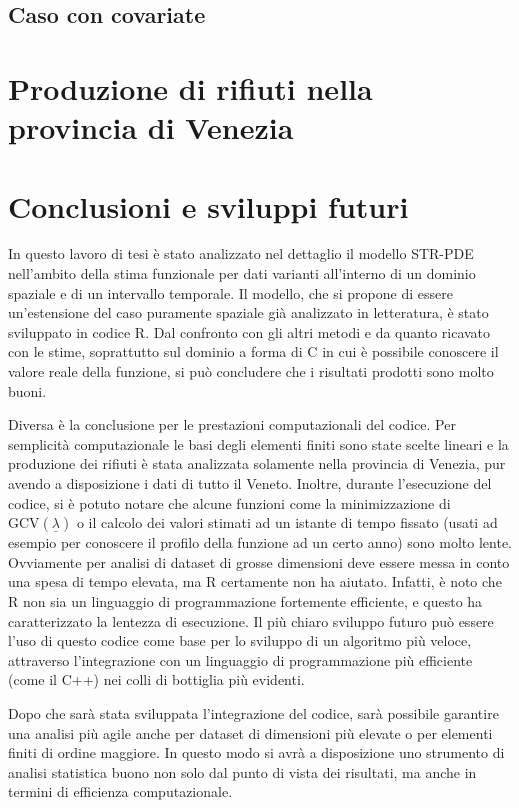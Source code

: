 \documentclass[a4paper,11pt,twoside,openright]{book}							%
\begin{document}
\section{Caso con covariate}


\chapter{Produzione di rifiuti nella provincia di Venezia}
\label{cap:rifiuti}



\chapter{Conclusioni e sviluppi futuri}
\label{cap:conclusione}

In questo lavoro di tesi è stato analizzato nel dettaglio il modello STR-PDE nell'ambito della stima funzionale per dati varianti all'interno di un dominio spaziale e di un intervallo temporale. Il modello, che si propone di essere un'estensione del caso puramente spaziale già analizzato in letteratura, è stato sviluppato in codice R. Dal confronto con gli altri metodi e da quanto ricavato con le stime, soprattutto sul dominio a forma di C in cui è possibile conoscere il valore reale della funzione, si può concludere che i risultati prodotti sono molto buoni.

Diversa è la conclusione per le prestazioni computazionali del codice. Per semplicità computazionale le basi degli elementi finiti sono state scelte lineari e la produzione dei rifiuti è stata analizzata solamente nella provincia di Venezia, pur avendo a disposizione i dati di tutto il Veneto. Inoltre, durante l'esecuzione del codice, si è potuto notare che alcune funzioni come la minimizzazione di $\mathrm{GCV}(\underline \lambda)$ o il calcolo dei valori stimati ad un istante di tempo fissato (usati ad esempio per conoscere il profilo della funzione ad un certo anno) sono molto lente. Ovviamente per analisi di dataset di grosse dimensioni deve essere messa in conto una spesa di tempo elevata, ma R certamente non ha aiutato. Infatti, è noto che R non sia un linguaggio di programmazione fortemente efficiente, e questo ha caratterizzato la lentezza di esecuzione. Il più chiaro sviluppo futuro può essere l'uso di questo codice come base per lo sviluppo di un algoritmo più veloce, attraverso l'integrazione con un linguaggio di programmazione più efficiente (come il C++) nei colli di bottiglia più evidenti.

Dopo che sarà stata sviluppata l'integrazione del codice, sarà possibile garantire una analisi più agile anche per dataset di dimensioni più elevate o per elementi finiti di ordine maggiore. In questo modo si avrà a disposizione uno strumento di analisi statistica buono non solo dal punto di vista dei risultati, ma anche in termini di efficienza computazionale.
\end{document}
